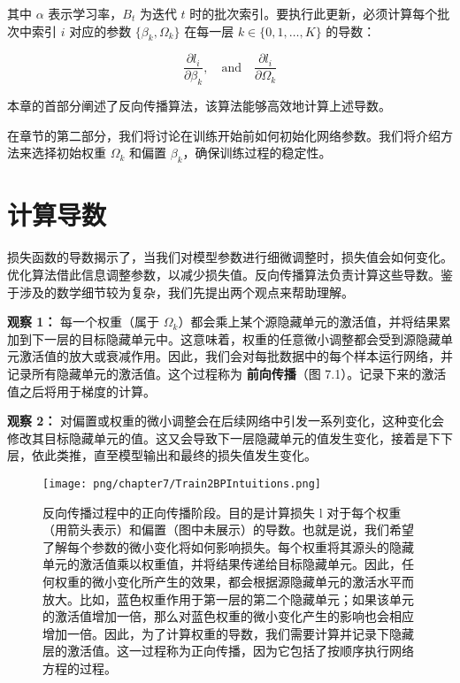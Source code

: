 其中 \(\alpha\) 表示学习率，\(B_t\) 为迭代 \(t\) 时的批次索引。要执行此更新，必须计算每个批次中索引 \(i\) 对应的参数 \(\{\beta_k, \Omega_k\}\) 在每一层 \(k \in \{0, 1, \ldots, K\}\) 的导数：

\begin{equation}
\frac{\partial l_i}{\partial \beta_k}, \quad \text{and} \quad \frac{\partial l_i}{\partial \Omega_k} 
\end{equation}

本章的首部分阐述了反向传播算法，该算法能够高效地计算上述导数。

在章节的第二部分，我们将讨论在训练开始前如何初始化网络参数。我们将介绍方法来选择初始权重 \(\Omega_k\) 和偏置 \(\beta_k\)，确保训练过程的稳定性。
\section{计算导数}

损失函数的导数揭示了，当我们对模型参数进行细微调整时，损失值会如何变化。优化算法借此信息调整参数，以减少损失值。反向传播算法负责计算这些导数。鉴于涉及的数学细节较为复杂，我们先提出两个观点来帮助理解。

\textbf{观察 1：} 每一个权重（属于 \(\Omega_k\)）都会乘上某个源隐藏单元的激活值，并将结果累加到下一层的目标隐藏单元中。这意味着，权重的任意微小调整都会受到源隐藏单元激活值的放大或衰减作用。因此，我们会对每批数据中的每个样本运行网络，并记录所有隐藏单元的激活值。这个过程称为 \textbf{前向传播}（图 7.1）。记录下来的激活值之后将用于梯度的计算。

\textbf{观察 2：} 对偏置或权重的微小调整会在后续网络中引发一系列变化，这种变化会修改其目标隐藏单元的值。这又会导致下一层隐藏单元的值发生变化，接着是下下层，依此类推，直至模型输出和最终的损失值发生变化。

\begin{figure}[ht!]
\centering
\texttt{[image: png/chapter7/Train2BPIntuitions.png]}
\caption{反向传播过程中的正向传播阶段。目的是计算损失 l 对于每个权重（用箭头表示）和偏置（图中未展示）的导数。也就是说，我们希望了解每个参数的微小变化将如何影响损失。每个权重将其源头的隐藏单元的激活值乘以权重值，并将结果传递给目标隐藏单元。因此，任何权重的微小变化所产生的效果，都会根据源隐藏单元的激活水平而放大。比如，蓝色权重作用于第一层的第二个隐藏单元；如果该单元的激活值增加一倍，那么对蓝色权重的微小变化产生的影响也会相应增加一倍。因此，为了计算权重的导数，我们需要计算并记录下隐藏层的激活值。这一过程称为正向传播，因为它包括了按顺序执行网络方程的过程。}
\end{figure}

